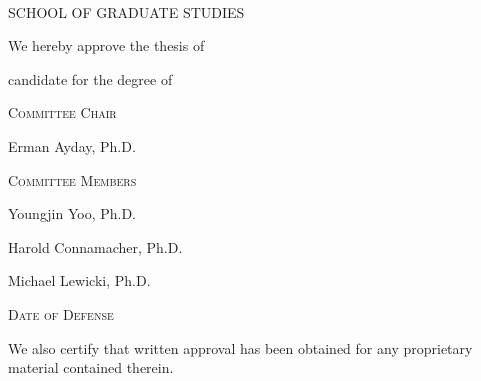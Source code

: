 \begin{center}
\large

\MakeUppercase{\thesisInstitution \\ School of Graduate Studies}

\vspace{0.2in}

We hereby approve the thesis of

\thesisAuthor

candidate for the degree of

\thesisDegree

\vspace{0.2in}

\textsc{Committee Chair}

Erman Ayday, Ph.D.

\vspace{0.2in}

\textsc{Committee Members}

Youngjin Yoo, Ph.D.

Harold Connamacher, Ph.D.

Michael Lewicki, Ph.D.

\vspace{0.2in}

\textsc{Date of Defense}

\thesisDefenseDate

\vspace{0.2in}

We also certify that written approval has been obtained for any proprietary material contained therein.
\end{center}